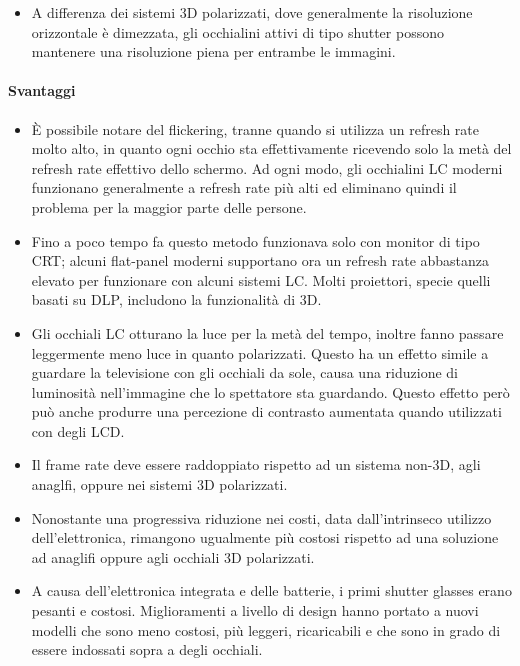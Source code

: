 \documentclass[8pt]{extarticle}
\begin{document}
\begin{multicols}{3}
\begin{itemize}
    \item A differenza dei sistemi 3D polarizzati, dove generalmente la risoluzione
    orizzontale è dimezzata, gli occhialini attivi di tipo shutter possono mantenere
    una risoluzione piena per entrambe le immagini. 
\end{itemize}

\paragraph{Svantaggi}
\begin{itemize}
    \item È possibile notare del flickering, tranne quando si utilizza un refresh rate molto alto,
    in quanto ogni occhio sta effettivamente ricevendo solo la metà del refresh rate effettivo dello
    schermo. Ad ogni modo, gli occhialini LC moderni funzionano generalmente a refresh rate più alti
    ed eliminano quindi il problema per la maggior parte delle persone.
    \item Fino a poco tempo fa questo metodo funzionava solo con monitor di tipo CRT; alcuni
    flat-panel moderni supportano ora un refresh rate abbastanza elevato per funzionare con 
    alcuni sistemi LC. Molti proiettori, specie quelli basati su DLP, includono la
    funzionalità di 3D.
    \item Gli occhiali LC otturano la luce per la metà del tempo, inoltre fanno passare leggermente
    meno luce in quanto polarizzati. Questo ha un effetto simile a guardare la televisione con
    gli occhiali da sole, causa una riduzione di luminosità nell'immagine che lo spettatore 
    sta guardando. Questo effetto però può anche produrre una percezione di contrasto aumentata
    quando utilizzati con degli LCD.
    \item Il frame rate deve essere raddoppiato rispetto ad un sistema non-3D, agli anaglfi, oppure
    nei sistemi 3D polarizzati.
    \item Nonostante una progressiva riduzione nei costi, data dall'intrinseco utilizzo
    dell'elettronica, rimangono ugualmente più costosi rispetto ad una soluzione ad anaglifi oppure
    agli occhiali 3D polarizzati.
    \item A causa dell'elettronica integrata e delle batterie, i primi shutter glasses erano pesanti
    e costosi. Miglioramenti a livello di design hanno portato a nuovi modelli che sono meno costosi,
    più leggeri, ricaricabili e che sono in grado di essere indossati sopra a degli occhiali.
\end{itemize}



\end{multicols}
\end{document}
